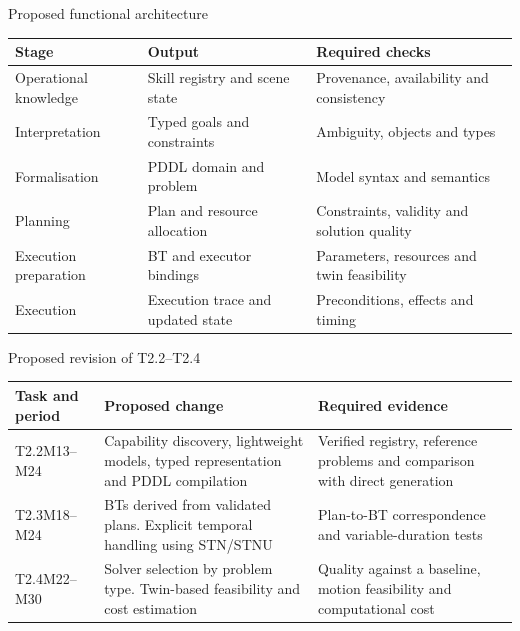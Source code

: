 \documentclass[aspectratio=169,11pt]{beamer}
\begin{document}
\begin{frame}{Proposed functional architecture}
\small\renewcommand{\arraystretch}{1.3}
\begin{tabularx}{\textwidth}{@{}p{}XX@{}}
\toprule
Stage & Output & Required checks\\\midrule
Operational knowledge & Skill registry and scene state & Provenance, availability and consistency\\
Interpretation & Typed goals and constraints & Ambiguity, objects and types\\
Formalisation & PDDL domain and problem & Model syntax and semantics\\
Planning & Plan and resource allocation & Constraints, validity and solution quality\\
Execution preparation & BT and executor bindings & Parameters, resources and twin feasibility\\
Execution & Execution trace and updated state & Preconditions, effects and timing\\\bottomrule
\end{tabularx}
\end{frame}

\begin{frame}{Proposed revision of T2.2--T2.4}
\small\renewcommand{\arraystretch}{1.35}
\begin{tabularx}{\textwidth}{@{}p{}XX@{}}
\toprule
Task and period & Proposed change & Required evidence\\\midrule
T2.2\newline M13--M24 & Capability discovery, lightweight models, typed representation and PDDL compilation & Verified registry, reference problems and comparison with direct generation\\
T2.3\newline M18--M24 & BTs derived from validated plans. Explicit temporal handling using STN/STNU & Plan-to-BT correspondence and variable-duration tests\\
T2.4\newline M22--M30 & Solver selection by problem type. Twin-based feasibility and cost estimation & Quality against a baseline, motion feasibility and computational cost\\\bottomrule
\end{tabularx}
\end{frame}
\end{document}
